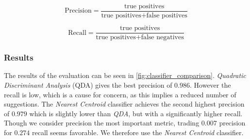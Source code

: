 
\begin{equation}\label{eq:precision}
\text{Precision} = \frac{\text{true positives}}{\text{true positives} + \text{false positives}}
\end{equation}

\begin{equation}\label{eq:recall}
\text{Recall} = \frac{\text{true positives}}{\text{true positives} + \text{false negatives}}
\end{equation}


\subsubsection{Results}
The results of the evaluation can be seen in \cref{fig:classifier_comparison}. \emph{Quadratic Discriminant Analysis} (QDA) gives the best precision of $0.986$. However the recall is low, which is a cause for concern, as this implies a reduced number of suggestions. The \emph{Nearest Centroid} classifier achieves the second highest precision of $0.979$ which is slightly lower than \emph{QDA}, but with a significantly higher recall. Though we consider precision the most important metric, trading $0.007$ precision for $0.274$ recall seems favorable. We therefore use the \emph{Nearest Centroid} classifier.


